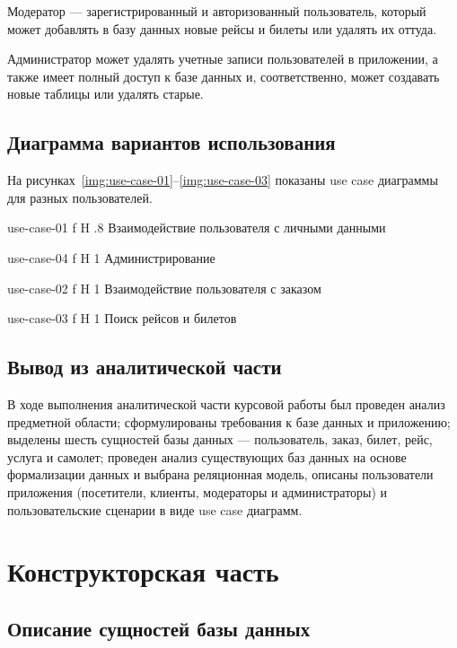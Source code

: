 \documentclass{bmstu}
\begin{document}
Модератор --- зарегистрированный и авторизованный пользователь, который может добавлять в базу данных новые рейсы и билеты или удалять их оттуда.

Администратор может удалять учетные записи пользователей в приложении, а также имеет полный доступ к базе данных и, соответственно, может создавать новые таблицы или удалять старые.

\pagebreak
\section{Диаграмма вариантов использования}

На рисунках~\ref{img:use-case-01}--\ref{img:use-case-03} показаны use case диаграммы для разных пользователей.

    {use-case-01}
    {f}
    {H}
    {.8\textwidth}
    {Взаимодействие пользователя с личными данными}
    
    {use-case-04}
    {f}
    {H}
    {1\textwidth}
    {Администрирование}
    
    {use-case-02}
    {f}
    {H}
    {1\textwidth}
    {Взаимодействие пользователя с заказом}
    
    {use-case-03}
    {f}
    {H}
    {1\textwidth}
    {Поиск рейсов и билетов}

\section*{Вывод из аналитической части}

В ходе выполнения аналитической части курсовой работы был проведен анализ предметной области; сформулированы требования к базе данных и приложению; выделены шесть сущностей базы данных --- пользователь, заказ, билет, рейс, услуга и самолет; проведен анализ существующих баз данных на основе формализации данных и выбрана реляционная модель, описаны пользователи приложения (посетители, клиенты, модераторы и администраторы) и пользовательские сценарии в виде use case диаграмм.

\chapter{Конструкторская часть}

\section{Описание сущностей базы данных}
\end{document}
